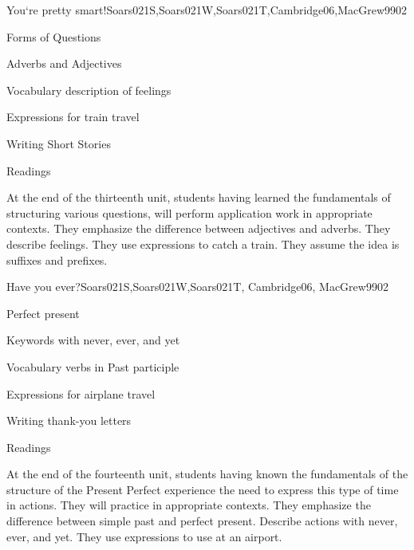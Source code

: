 \begin{syllabus}
\begin{unit}{You`re pretty smart!}{}{Soars021S,Soars021W,Soars021T,Cambridge06,MacGrew99}{0}{2}
\begin{topics}
      \item Forms of Questions
      \item Adverbs and Adjectives
      \item Vocabulary description of feelings
      \item Expressions for train travel
      \item Writing Short Stories
      \item Readings
   \end{topics}

   \begin{learningoutcomes}
      \item At the end of the thirteenth unit, students having learned the fundamentals of structuring various questions, will perform application work in appropriate contexts. They emphasize the difference between adjectives and adverbs. They describe feelings. They use expressions to catch a train. They assume the idea is suffixes and prefixes.
   \end{learningoutcomes}

\end{unit}

\begin{unit}{Have you ever?}{}{Soars021S,Soars021W,Soars021T, Cambridge06, MacGrew99}{0}{2}
   \begin{topics}
      \item Perfect present
      \item Keywords with never, ever, and yet
      \item Vocabulary verbs in Past participle
      \item Expressions for airplane travel
      \item Writing thank-you letters
      \item Readings
   \end{topics}

   \begin{learningoutcomes}
      \item At the end of the fourteenth unit, students having known the fundamentals of the structure of the Present Perfect experience the need to express this type of time in actions. They will practice in appropriate contexts. They emphasize the difference between simple past and perfect present. Describe actions with never, ever, and yet. They use expressions to use at an airport.
   \end{learningoutcomes}

\end{unit}

\begin{coursebibliography}
\end{coursebibliography}

\end{syllabus}
%
